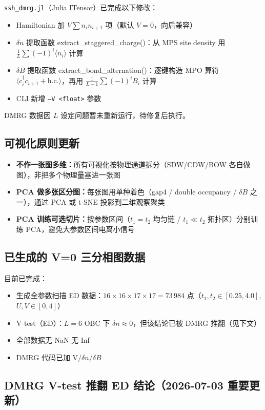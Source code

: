 \documentclass[11pt,a4paper]{article}
\begin{document}
\texttt{ssh\_dmrg.jl}（Julia ITensor）已完成以下修改：
\begin{itemize}
  \item Hamiltonian 加 $V\sum n_i n_{i+1}$ 项（默认 $V=0$，向后兼容）
  \item $\delta n$ 提取函数 extract\_staggered\_charge()：从 MPS site density 用 $\frac{1}{L}\sum(-1)^i\langle n_i\rangle$ 计算
  \item $\delta B$ 提取函数 extract\_bond\_alternation()：逐键构造 MPO 算符 $\langle c^\dagger_i c_{i+1} + \text{h.c.}\rangle$，再用 $\frac{1}{L-1}\sum(-1)^i B_i$ 计算
  \item CLI 新增 {\tt --V <float>} 参数
\end{itemize}
DMRG 数据因 $L$ 设定问题暂未重新运行，待修复后执行。

\subsection{可视化原则更新}

\begin{itemize}
  \item \textbf{不作一张图多维：}所有可视化按物理通道拆分（SDW/CDW/BOW 各自做图），非把多个物理量塞进一张图
  \item \textbf{PCA 做多张区分图：}每张图用单种着色（gap4 / double occupancy / $\delta B$ 之一），通过 PCA 或 t-SNE 投影到二维观察聚类
  \item \textbf{PCA 训练可选切片：}按参数区间（$t_1=t_2$ 均匀链 / $t_1\ll t_2$ 拓扑区）分别训练 PCA，避免大参数区间电离小信号
\end{itemize}

\subsection{已生成的 V=0 三分相图数据}

目前已完成：
\begin{itemize}
  \item 生成全参数扫描 ED 数据：$16\times16\times17\times17 = 73\,984$ 点（$t_1,t_2\in[0.25,4.0]$, $U,V\in[0,4]$）
  \item V-test（ED）：$L=6$ OBC 下 $\delta n\approx 0$，但该结论已被 DMRG 推翻（见下文）
  \item 全部数据无 NaN 无 Inf
  \item DMRG 代码已加 V/$\delta n$/$\delta B$
\end{itemize}

\subsection{DMRG V-test 推翻 ED 结论（2026-07-03 重要更新）}
\end{document}
